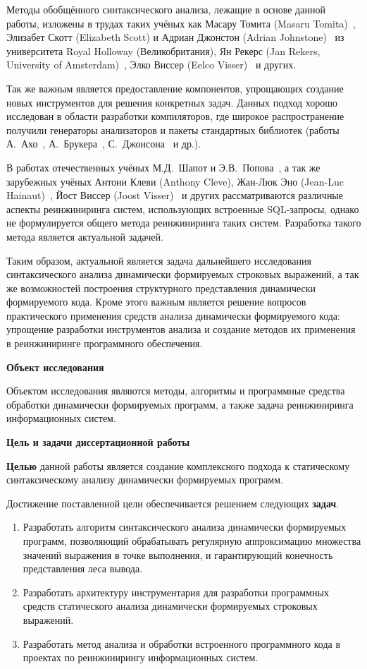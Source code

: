 Методы обобщённого синтаксического анализа, лежащие в основе данной работы, изложены в трудах таких учёных как Масару Томита (Masaru Tomita)~\cite{Tomita}, Элизабет Скотт (Elizabeth Scott) и Адриан Джонстон (Adrian Johnstone)~\cite{RNGLR,RIGLR} из университета Royal Holloway (Великобритания), Ян Рекерс (Jan Rekers, University of Amsterdam)~\cite{SPPF}, Элко Виссер (Eelco Visser)~\cite{RNGLRSyntaxerror2,RNGLRSyntaxerror3} и других.

Так же важным является предоставление компонентов, упрощающих создание новых инструментов для решения конкретных задач. Данных подход хорошо исследован в области разработки компиляторов, где широкое распространение получили генераторы анализаторов и пакеты стандартных библиотек (работы А.~Ахо~\cite{Dragon}, А.~Брукера~\cite{CompilerCompiler}, С.~Джонсона~\cite{yaccBook} и др.). 

В работах отечественных учёных М.Д.~Шапот и Э.В.~Попова~\cite{DynamicDSQLTranslation}, а так же зарубежных учёных Антони Клеви (Anthony Cleve), Жан-Люк Эно (Jean-Luc Hainaut)~\cite{DSQLReverseEngineering}, Йост Виссер (Joost Visser)~\cite{DSQLQualityMesure} и других рассматриваются различные аспекты реинжиниринга систем, использующих встроенные SQL-запросы, однако не формулируется общего метода реинжиниринга таких систем. Разработка такого метода является актуальной задачей.

Таким образом, актуальной является задача дальнейшего исследования синтаксического анализа динамически формируемых строковых выражений, а так же возможностей построения структурного представления динамически формируемого кода. Кроме этого важным является решение вопросов практического применения средств анализа динамически формируемого кода: упрощение разработки инструментов анализа и создание методов их применения в реинжиниринге программного обеспечения.

\textbf{Объект исследования}

Объектом исследования являются методы, алгоритмы и программные средства обработки динамически формируемых программ, а также задача реинжиниринга информационных систем.

\textbf{Цель и задачи диссертационной работы}

\textbf{Целью} данной работы является создание комплексного подхода к статическому синтаксическому анализу динамически формируемых программ.

Достижение поставленной цели обеспечивается решением следующих \textbf{задач}.
\begin{enumerate}
    \item Разработать алгоритм синтаксического анализа динамически формируемых программ, позволяющий обрабатывать регулярную аппроксимацию множества значений выражения в точке выполнения, и гарантирующий конечность представления леса вывода.
    \item Разработать архитектуру инструментария для разработки программных средств статического анализа динамически формируемых строковых выражений.
    \item Разработать метод анализа и обработки встроенного программного кода в проектах по реинжинирингу информационных систем.
\end{enumerate}

